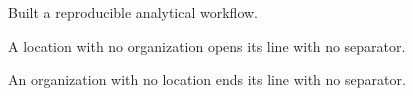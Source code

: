\documentclass[fontsize=10pt, margin=normal, entrymeta=inline]{careerdossier-resume}
\begin{document}
\MakeCDossierHeader
{}
\begin{CDossierEntry}[
  title        = {Senior Data Scientist},
  organization = {Example Corp},
  location     = {Berlin, DE},
  dates        = {2020--2024}
]
  \begin{CDossierItemize}
    \item Built a reproducible analytical workflow.
  \end{CDossierItemize}
\end{CDossierEntry}
\begin{CDossierEntry}[
  title    = {Volunteer Reviewer},
  location = {Remote}
]
  \begin{CDossierItemize}
    \item A location with no organization opens its line with no separator.
  \end{CDossierItemize}
\end{CDossierEntry}
\begin{CDossierEntry}[
  title        = {Workshop Facilitator},
  organization = {Example Trust}
]
  \begin{CDossierItemize}
    \item An organization with no location ends its line with no separator.
  \end{CDossierItemize}
\end{CDossierEntry}
\end{document}
